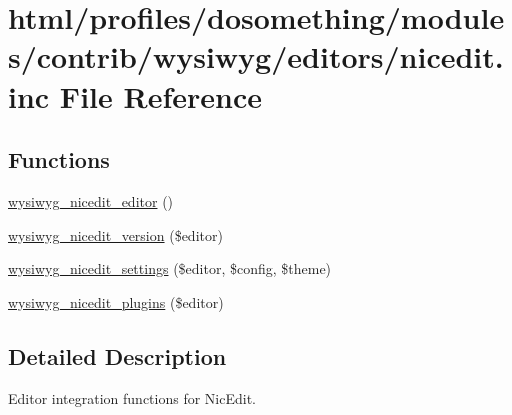 \hypertarget{nicedit_8inc}{
\section{html/profiles/dosomething/modules/contrib/wysiwyg/editors/nicedit.inc File Reference}
\label{nicedit_8inc}
}
\subsection*{Functions}
\begin{DoxyCompactItemize}
\item 
\hyperlink{nicedit_8inc_a8d4253f3374b29ad13987b030c4dc2f4}{wysiwyg\_\-nicedit\_\-editor} ()
\item 
\hyperlink{nicedit_8inc_a8915ea024241d8faa74d660eeb6eed62}{wysiwyg\_\-nicedit\_\-version} (\$editor)
\item 
\hyperlink{nicedit_8inc_afd9ce25e90a2aff57911a3a456b99bf6}{wysiwyg\_\-nicedit\_\-settings} (\$editor, \$config, \$theme)
\item 
\hyperlink{nicedit_8inc_a6aeb51d85563cf83611940ab3c34a872}{wysiwyg\_\-nicedit\_\-plugins} (\$editor)
\end{DoxyCompactItemize}


\subsection{Detailed Description}
Editor integration functions for NicEdit. 

